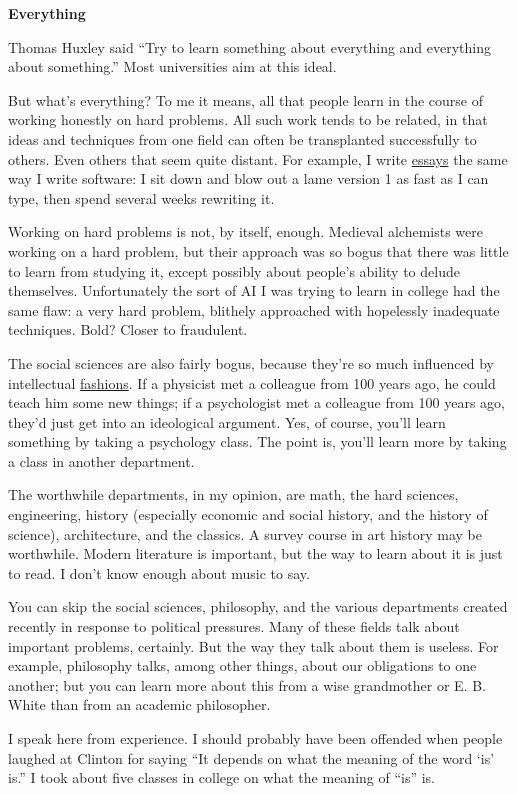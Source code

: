 \textbf{Everything}

Thomas Huxley said ``Try to learn something about everything and
everything about something.'' Most universities aim at this ideal.

But what's everything? To me it means, all that people learn in the
course of working honestly on hard problems. All such work tends to be
related, in that ideas and techniques from one field can often be
transplanted successfully to others. Even others that seem quite
distant. For example, I write \href{essay.html}{essays} the same way I
write software: I sit down and blow out a lame version 1 as fast as I
can type, then spend several weeks rewriting it.

Working on hard problems is not, by itself, enough. Medieval alchemists
were working on a hard problem, but their approach was so bogus that
there was little to learn from studying it, except possibly about
people's ability to delude themselves. Unfortunately the sort of AI I
was trying to learn in college had the same flaw: a very hard problem,
blithely approached with hopelessly inadequate techniques. Bold? Closer
to fraudulent.

The social sciences are also fairly bogus, because they're so much
influenced by intellectual \href{say.html}{fashions}. If a physicist met
a colleague from 100 years ago, he could teach him some new things; if a
psychologist met a colleague from 100 years ago, they'd just get into an
ideological argument. Yes, of course, you'll learn something by taking a
psychology class. The point is, you'll learn more by taking a class in
another department.

The worthwhile departments, in my opinion, are math, the hard sciences,
engineering, history (especially economic and social history, and the
history of science), architecture, and the classics. A survey course in
art history may be worthwhile. Modern literature is important, but the
way to learn about it is just to read. I don't know enough about music
to say.

You can skip the social sciences, philosophy, and the various
departments created recently in response to political pressures. Many of
these fields talk about important problems, certainly. But the way they
talk about them is useless. For example, philosophy talks, among other
things, about our obligations to one another; but you can learn more
about this from a wise grandmother or E. B. White than from an academic
philosopher.

I speak here from experience. I should probably have been offended when
people laughed at Clinton for saying ``It depends on what the meaning of
the word `is' is.'' I took about five classes in college on what the
meaning of ``is'' is.

